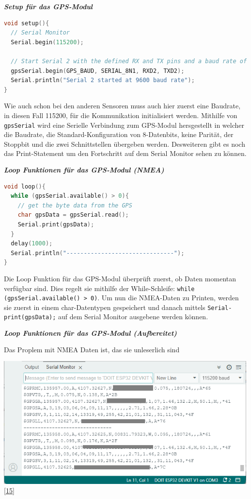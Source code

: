 \documentclass[
    headings=optiontotocandhead,%
    twoside,
    numbers=noenddot,%
    12pt, %
    titlepage, %
    parskip=full, %
    listof=leveldown, 
    numbers=noenddot, %
    a4paper,DIV=14,
    BCOR=15mm,
]{scrbook}
\newcommand{\passthrough}[1]{#1}
\begin{document}
\textbf{\emph{Setup für das GPS-Modul}}

\begin{lstlisting}[language={C++}, caption={GY-GPSMV2 Setup}]
void setup(){
  // Serial Monitor
  Serial.begin(115200);
  
  // Start Serial 2 with the defined RX and TX pins and a baud rate of 9600
  gpsSerial.begin(GPS_BAUD, SERIAL_8N1, RXD2, TXD2);
  Serial.println("Serial 2 started at 9600 baud rate");
}
\end{lstlisting}

Wie auch schon bei den anderen Sensoren muss auch hier zuerst eine
Baudrate, in diesen Fall 115200, für die Kommunikation initialisiert
werden. Mithilfe von \passthrough{\lstinline!gpsSerial!} wird eine
Serielle Verbindung zum GPS-Modul hersgestellt in welcher die Baudrate,
die Standard-Konfiguration von 8-Datenbits, keine Parität, der Stoppbit
und die zwei Schnittstellen übergeben werden. Desweiteren gibt es noch
das Print-Statement um den Fortschritt auf dem Serial Monitor sehen zu
können.

\textbf{\emph{Loop Funktionen für das GPS-Modul (NMEA)}}

\begin{lstlisting}[language={C++}, caption={GY-GPSMV2 Test Programm mit Daten in Rohform}]
void loop(){
  while (gpsSerial.available() > 0){
    // get the byte data from the GPS
    char gpsData = gpsSerial.read();
    Serial.print(gpsData);
  }
  delay(1000);
  Serial.println("-------------------------------");
}
\end{lstlisting}

Die Loop Funktion für das GPS-Modul überprüft zuerst, ob Daten momentan
verfügbar sind. Dies regelt sie mithilfe der While-Schleife:
\passthrough{\lstinline!while (gpsSerial.available() > 0)!}. Um nun die
NMEA-Daten zu Printen, werden sie zuerst in einem char-Datentypen
gespeichert und danach mittels
\passthrough{\lstinline!Serial-print(gpsData);!} auf dem Serial Monitor
ausgebene werden können.

\textbf{\emph{Loop Funktionen für das GPS-Modul (Aufbereitet)}}

Das Proplem mit NMEA Daten ist, das sie unleserlich sind

\includegraphics[width=5.20833in,height=\textheight]{img/Kampl/NMEA-Ausgabe.png}
{[}\protect\hyperlink{ref-GPS-Testprogramm}{15}{]}
\end{document}

